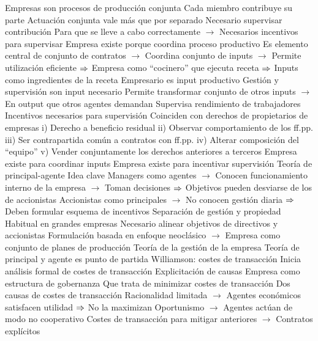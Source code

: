 \documentclass{nuevotema}
\begin{document}
\begin{esquemal}
				\4 Empresas son procesos de producción conjunta
				\4[] Cada miembro contribuye su parte
				\4[] Actuación conjunta vale más que por separado
				\4 Necesario supervisar contribución
				\4[] Para que se lleve a cabo correctamente
				\4[] $\to$ Necesarios incentivos para supervisar
				\4 Empresa existe porque coordina proceso productivo
				\4[] Es elemento central de conjunto de contratos
				\4[] $\to$ Coordina conjunto de inputs
				\4[] $\to$ Permite utilización eficiente
				\4[] $\then$ Empresa como ``cocinero'' que ejecuta receta
				\4[] $\then$ Inputs como ingredientes de la receta
				\4[$\then$] Empresario es input productivo
				\4[] Gestión y supervisión son input necesario
				\4[] Permite transformar conjunto de otros inputs
				\4[] $\to$ En output que otros agentes demandan
				\4[] Supervisa rendimiento de trabajadores
				\4 Incentivos necesarios para supervisión
				\4[] Coinciden con derechos de propietarios de empresas
				\4[] i) Derecho a beneficio residual
				\4[] ii) Observar comportamiento de los ff.pp.
				\4[] iii) Ser contrapartida común a contratos con ff.pp.
				\4[] iv) Alterar composición del ``equipo''
				\4[] v) Vender conjuntamente los derechos anteriores a terceros
				\4[$\then$] Empresa existe para coordinar inputs
				\4[$\then$] Empresa existe para incentivar supervisión
			\3 Teoría de principal-agente
				\4 Idea clave
				\4[] Managers como agentes
				\4[] $\to$ Conocen funcionamiento interno de la empresa
				\4[] $\to$ Toman decisiones
				\4[] $\then$ Objetivos pueden desviarse de los de accionistas
				\4[] Accionistas como principales
				\4[] $\to$ No conocen gestión diaria
				\4[] $\then$ Deben formular esquema de incentivos
				\4 Separación de gestión y propiedad
				\4[] Habitual en grandes empresas
				\4[] Necesario alinear objetivos de directivos y accionistas
				\4 Formulación basada en enfoque neoclásico
				\4[] $\to$ Empresa como conjunto de planes de producción
				\4 Teoría de la gestión de la empresa
				\4[] Teoría de principal y agente es punto de partida
			\3 Williamson: costes de transacción
				\4 Inicia análisis formal de costes de transacción
				\4[] Explicitación de causas
				\4 Empresa como estructura de gobernanza
				\4[] Que trata de minimizar costes de transacción
				\4 Dos causas de costes de transacción
				\4[] Racionalidad limitada
				\4[] $\to$ Agentes económicos satisfacen utilidad
				\4[] $\then$ No la maximizan
				\4[] Oportunismo
				\4[] $\to$ Agentes actúan de modo no cooperativo
				\4[$\then$] Costes de transacción para mitigar anteriores
				\4[] $\to$ Contratos explícitos

\end{esquemal}
\end{document}
